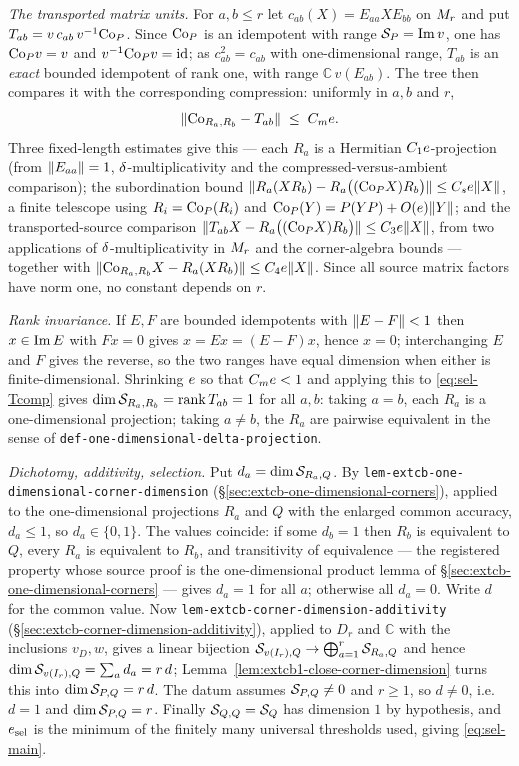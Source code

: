 \emph{The transported matrix units.} For $a,b\le r$ let $c_{ab}(X)=E_{aa}XE_{bb}$ on
$M_{r}$ and put $T_{ab}=v\,c_{ab}\,v^{-1}\mathrm{Co}_{P}$. Since $\mathrm{Co}_{P}$ is an idempotent with
range $\mathcal S_{P}=\operatorname{Im} v$, one has $\mathrm{Co}_{P}v=v$ and $v^{-1}\mathrm{Co}_{P}v=\mathrm{id}$; as
$c_{ab}^{2}=c_{ab}$ with one-dimensional range, $T_{ab}$ is an \emph{exact} bounded
idempotent of rank one, with range $\mathbb C\,v(E_{ab})$. The tree then compares it with
the corresponding compression: uniformly in $a,b$ and $r$,
\begin{equation}\label{eq:sel-Tcomp}
  \lVert \mathrm{Co}_{R_a,R_b}-T_{ab}\rVert\;\le\;C_me .
\end{equation}
Three fixed-length estimates give this --- each $R_a$ is a Hermitian $C_1e$-projection
(from $\lVert E_{aa}\rVert=1$, $\delta$-multiplicativity and the compressed-versus-ambient
comparison); the subordination bound
$\lVert R_a(XR_b)-R_a\bigl((\mathrm{Co}_{P}X)R_b\bigr)\rVert\le C_se\lVert X\rVert$, a finite telescope using
$R_i=\mathrm{Co}_{P}(R_i)$ and $\mathrm{Co}_{P}(Y)=P(YP)+O(e)\lVert Y\rVert$; and the transported-source
comparison $\lVert T_{ab}X-R_a\bigl((\mathrm{Co}_{P}X)R_b\bigr)\rVert\le C_3e\lVert X\rVert$, from two
applications of $\delta$-multiplicativity in $M_{r}$ and the corner-algebra bounds ---
together with $\lVert \mathrm{Co}_{R_a,R_b}X-R_a(XR_b)\rVert\le C_4e\lVert X\rVert$. Since all source
matrix factors have norm one, no constant depends on $r$.

\emph{Rank invariance.} If $E,F$ are bounded idempotents with $\lVert E-F\rVert<1$ then
$x\in\operatorname{Im} E$ with $Fx=0$ gives $x=Ex=(E-F)x$, hence $x=0$; interchanging $E$ and $F$ gives
the reverse, so the two ranges have equal dimension when either is finite-dimensional.
Shrinking $e$ so that $C_me<1$ and applying this to \eqref{eq:sel-Tcomp} gives
$\dim\mathcal S_{R_a,R_b}=\operatorname{rank} T_{ab}=1$ for all $a,b$: taking $a=b$, each $R_a$ is a
one-dimensional projection; taking $a\ne b$, the $R_a$ are pairwise equivalent in the
sense of \texttt{def-one-dimensional-delta-projection}.

\emph{Dichotomy, additivity, selection.} Put $d_a=\dim\mathcal S_{R_a,Q}$. By
\texttt{lem-extcb-one-dimensional-corner-dimension}
(\S\ref{sec:extcb-one-dimensional-corners}), applied to the one-dimensional projections
$R_a$ and $Q$ with the enlarged common accuracy, $d_a\le1$, so $d_a\in\{0,1\}$. The values
coincide: if some $d_b=1$ then $R_b$ is equivalent to $Q$, every $R_a$ is equivalent to
$R_b$, and transitivity of equivalence --- the registered property whose source proof is
the one-dimensional product lemma of \S\ref{sec:extcb-one-dimensional-corners} --- gives
$d_a=1$ for all $a$; otherwise all $d_a=0$. Write $d$ for the common value. Now
\texttt{lem-extcb-corner-dimension-additivity}
(\S\ref{sec:extcb-corner-dimension-additivity}), applied to $D_r$ and $\mathbb C$ with the
inclusions $v_D,w$, gives a linear bijection
$\mathcal S_{v(I_r),Q}\to\bigoplus_{a=1}^{r}\mathcal S_{R_a,Q}$ and hence
$\dim\mathcal S_{v(I_r),Q}=\sum_a d_a=r\,d$; Lemma~\ref{lem:extcb1-close-corner-dimension} turns
this into $\dim\mathcal S_{P,Q}=r\,d$. The datum assumes $\mathcal S_{P,Q}\ne0$ and $r\ge1$, so
$d\ne0$, i.e.\ $d=1$ and $\dim\mathcal S_{P,Q}=r$. Finally $\mathcal S_{Q,Q}=\mathcal S_{Q}$ has dimension
$1$ by hypothesis, and $e_{\mathrm{sel}}$ is the minimum of the finitely many
universal thresholds used, giving \eqref{eq:sel-main}.

